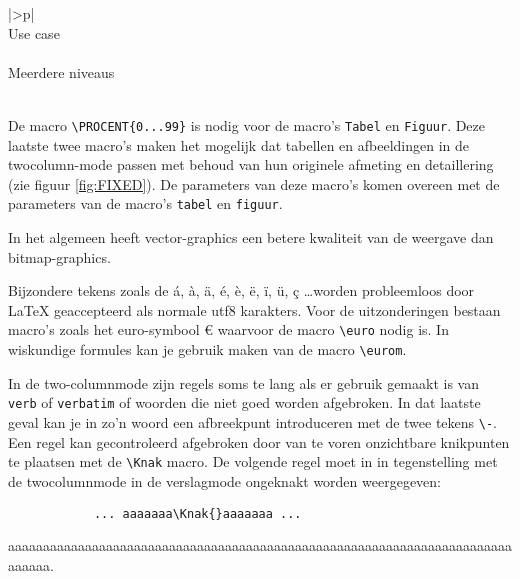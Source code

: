 	
	
	
	\begin{center}
		\begin{tabular}{|>\C p{}|}
			\hline
			~\\
			Use case\\
			~\\
			Meerdere niveaus\\
			~\\
			\hline
		\end{tabular}
	\end{center}
	
	De macro \verb!\PROCENT{0...99}! is nodig voor de macro's \verb!Tabel!
	en \verb!Figuur!. Deze laatste twee macro's maken het mogelijk dat
	tabellen en afbeeldingen in de twocolumn-mode passen met behoud van
	hun originele afmeting en detaillering (zie
	figuur \ref{fig:FIXED}). De parameters van deze macro's komen overeen
	met de parameters van de macro's \verb!tabel! en \verb!figuur!.
	
	
	
	In het algemeen heeft vector-graphics een betere kwaliteit van de
	weergave dan bitmap-graphics.
	
	
	
	Bijzondere tekens zoals de á, à, ä, é, è, ë, ï, ü, ç \ldots worden
	probleemloos door \LaTeX{} geaccepteerd als normale utf8
	karakters. Voor de uitzonderingen bestaan macro's zoals het
	euro-symbool \euro{} waarvoor de macro \verb!\euro! nodig is. In
	wiskundige formules kan je gebruik maken van de macro \verb!\eurom!.
	
	
	In de two-columnmode zijn regels soms te lang als er gebruik gemaakt
	is van \verb!verb! of \verb!verbatim! of woorden die niet goed worden
	afgebroken. In dat laatste geval kan je in zo'n woord een afbreekpunt
	introduceren met de twee tekens \verb!\-!. Een regel kan gecontroleerd
	afgebroken door van te voren onzichtbare knikpunten te plaatsen met de
	\verb!\Knak! macro. De volgende regel moet in in tegenstelling met de
	twocolumnmode in de verslagmode ongeknakt worden weergegeven:
	
	\begin{Aanpassen}
		\begin{verbatim}
			... aaaaaaa\Knak{}aaaaaaa ...
		\end{verbatim}
	\end{Aanpassen}
	
	
	aaaaaaaaaaaaaaaaaaaaaaaaaaaaaaaaaaaaaaa\Knak{}aaaaaaaaaaaaaaaaaaaaaaaaaaaaaaaaaaaaaaa.
	
